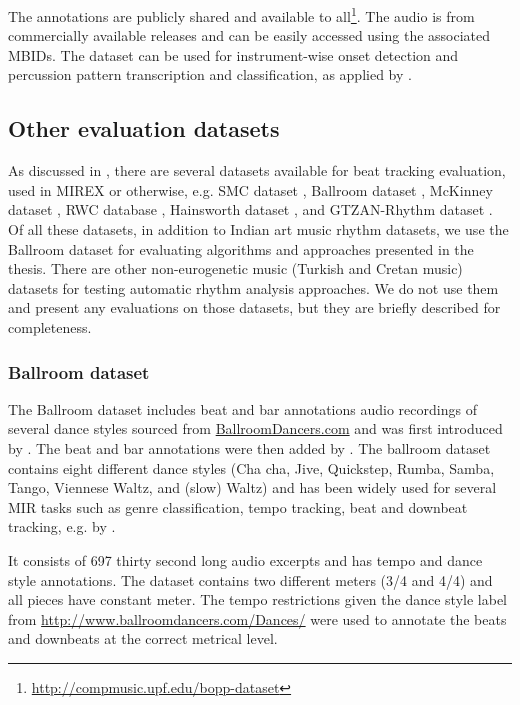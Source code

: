 The annotations are publicly shared and available to all\footnote{\url{http://compmusic.upf.edu/bopp-dataset}}. The audio is from commercially available releases and can be easily accessed using the associated \glspl{MBID}. The dataset can be used for instrument-wise onset detection and percussion pattern transcription and classification, as applied by . 
\subsection{Other evaluation datasets}
As discussed in , there are several datasets available for beat tracking evaluation, used in \gls{MIREX} or otherwise, e.g. SMC dataset \cite{holzapfel:12:beat}, Ballroom dataset \cite{gouyon:06:tempo}, McKinney dataset \cite{moelants:04:tempo}, RWC database \cite{goto:06:rwc}, Hainsworth dataset \cite{hainsworth:03:pfbeat}, and GTZAN-Rhythm dataset \cite{marchand:15:gtzanrhythm}. Of all these datasets, in addition to Indian art music rhythm datasets, we use the Ballroom dataset for evaluating algorithms and approaches presented in the thesis. There are other non-eurogenetic music (Turkish and Cretan music) datasets for testing automatic rhythm analysis approaches. We do not use them and present any evaluations on those datasets, but they are briefly described for completeness. 
\subsubsection{Ballroom dataset}
The Ballroom dataset includes beat and bar annotations audio recordings of several dance styles sourced from \url{BallroomDancers.com} and was first introduced by . The beat and bar annotations were then added by . The ballroom dataset contains eight different dance styles (Cha cha, Jive, Quickstep, Rumba, Samba, Tango, Viennese Waltz, and (slow) Waltz) and has been widely used for several \gls{MIR} tasks such as genre classification, tempo tracking, beat and downbeat tracking, e.g. by . 

It consists of 697 thirty second long audio excerpts and has tempo and dance style annotations. The dataset contains two different meters (3/4 and 4/4) and all pieces have constant meter. The tempo restrictions given the dance style label from \url{http://www.ballroomdancers.com/Dances/} were used to annotate the beats and downbeats at the correct metrical level. 

